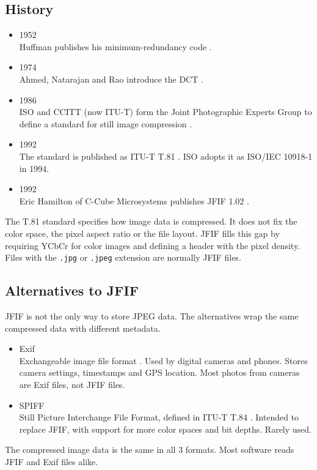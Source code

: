 \documentclass[11pt,a4paper]{article}
\begin{document}
\subsection{History}

\begin{itemize}
\item 1952\\
  Huffman publishes his minimum-redundancy code \cite{huffman1952}.
\item 1974\\
  Ahmed, Natarajan and Rao introduce the DCT \cite{ahmed1974}.
\item 1986\\
  ISO and CCITT (now ITU-T) form the Joint Photographic Experts Group to define a standard for still image compression \cite{wallace1992}.
\item 1992\\
  The standard is published as ITU-T T.81 \cite{t81}. ISO adopts it as ISO/IEC 10918-1 in 1994.
\item 1992\\
  Eric Hamilton of C-Cube Microsystems publishes JFIF 1.02 \cite{jfif}.
\end{itemize}

The T.81 standard specifies how image data is compressed. It does not fix the color space, the pixel aspect ratio or the file layout. JFIF fills this gap by requiring YCbCr for color images and defining a header with the pixel density. Files with the \texttt{.jpg} or \texttt{.jpeg} extension are normally JFIF files.

\subsection{Alternatives to JFIF}

JFIF is not the only way to store JPEG data. The alternatives wrap the same compressed data with different metadata.
\begin{itemize}
\item Exif\\
  Exchangeable image file format \cite{exif}. Used by digital cameras and phones. Stores camera settings, timestamps and GPS location. Most photos from cameras are Exif files, not JFIF files.
\item SPIFF\\
  Still Picture Interchange File Format, defined in ITU-T T.84 \cite{t84}. Intended to replace JFIF, with support for more color spaces and bit depths. Rarely used.
\end{itemize}
The compressed image data is the same in all 3 formats. Most software reads JFIF and Exif files alike.
\end{document}
